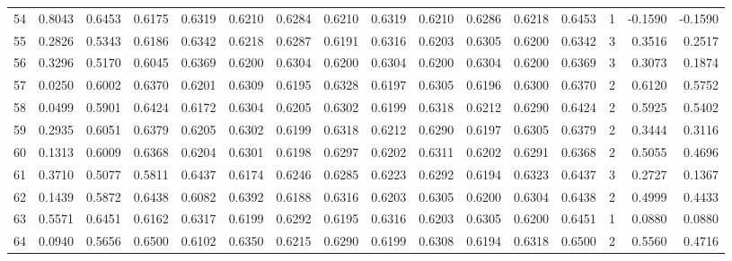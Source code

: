 \begin{tabular}{lrrrrrrrrrrrrrrr}
54  &      0.8043 &  0.6453 &  0.6175 &  0.6319 &  0.6210 &  0.6284 &  0.6210 &  0.6319 &  0.6210 &  0.6286 &   0.6218 &     0.6453 &      1 &                   -0.1590 &                    -0.1590 \\
55  &      0.2826 &  0.5343 &  0.6186 &  0.6342 &  0.6218 &  0.6287 &  0.6191 &  0.6316 &  0.6203 &  0.6305 &   0.6200 &     0.6342 &      3 &                    0.3516 &                     0.2517 \\
56  &      0.3296 &  0.5170 &  0.6045 &  0.6369 &  0.6200 &  0.6304 &  0.6200 &  0.6304 &  0.6200 &  0.6304 &   0.6200 &     0.6369 &      3 &                    0.3073 &                     0.1874 \\
57  &      0.0250 &  0.6002 &  0.6370 &  0.6201 &  0.6309 &  0.6195 &  0.6328 &  0.6197 &  0.6305 &  0.6196 &   0.6300 &     0.6370 &      2 &                    0.6120 &                     0.5752 \\
58  &      0.0499 &  0.5901 &  0.6424 &  0.6172 &  0.6304 &  0.6205 &  0.6302 &  0.6199 &  0.6318 &  0.6212 &   0.6290 &     0.6424 &      2 &                    0.5925 &                     0.5402 \\
59  &      0.2935 &  0.6051 &  0.6379 &  0.6205 &  0.6302 &  0.6199 &  0.6318 &  0.6212 &  0.6290 &  0.6197 &   0.6305 &     0.6379 &      2 &                    0.3444 &                     0.3116 \\
60  &      0.1313 &  0.6009 &  0.6368 &  0.6204 &  0.6301 &  0.6198 &  0.6297 &  0.6202 &  0.6311 &  0.6202 &   0.6291 &     0.6368 &      2 &                    0.5055 &                     0.4696 \\
61  &      0.3710 &  0.5077 &  0.5811 &  0.6437 &  0.6174 &  0.6246 &  0.6285 &  0.6223 &  0.6292 &  0.6194 &   0.6323 &     0.6437 &      3 &                    0.2727 &                     0.1367 \\
62  &      0.1439 &  0.5872 &  0.6438 &  0.6082 &  0.6392 &  0.6188 &  0.6316 &  0.6203 &  0.6305 &  0.6200 &   0.6304 &     0.6438 &      2 &                    0.4999 &                     0.4433 \\
63  &      0.5571 &  0.6451 &  0.6162 &  0.6317 &  0.6199 &  0.6292 &  0.6195 &  0.6316 &  0.6203 &  0.6305 &   0.6200 &     0.6451 &      1 &                    0.0880 &                     0.0880 \\
64  &      0.0940 &  0.5656 &  0.6500 &  0.6102 &  0.6350 &  0.6215 &  0.6290 &  0.6199 &  0.6308 &  0.6194 &   0.6318 &     0.6500 &      2 &                    0.5560 &                     0.4716 \\

\end{tabular}
